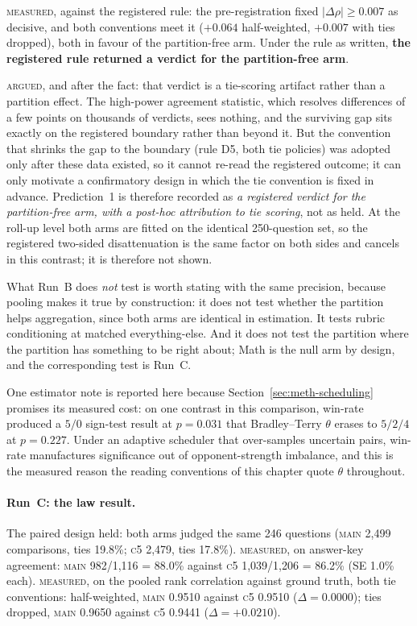 \textsc{measured}, against the registered rule: the pre-registration
fixed $|\Delta\rho| \ge 0.007$ as decisive, and both conventions meet
it ($+0.064$ half-weighted, $+0.007$ with ties dropped), both in
favour of the partition-free arm. Under the rule as written,
\textbf{the registered rule returned a verdict for the partition-free
arm}.

\textsc{argued}, and after the fact: that verdict is a tie-scoring
artifact rather than a partition effect. The high-power agreement
statistic, which resolves differences of a few points on thousands of
verdicts, sees nothing, and the surviving gap sits exactly on the
registered boundary rather than beyond it. But the convention that
shrinks the gap to the boundary (rule D5, both tie policies) was
adopted only after these data existed, so it cannot re-read the
registered outcome; it can only motivate a confirmatory design in
which the tie convention is fixed in advance. Prediction~1 is
therefore recorded as \emph{a registered verdict for the
partition-free arm, with a post-hoc attribution to tie scoring}, not
as held. At the roll-up level both arms are fitted on the identical
250-question set, so the registered two-sided disattenuation is the
same factor on both sides and cancels in this contrast; it is therefore
not shown.

What Run~B does \emph{not} test is worth stating with the same
precision, because pooling makes it true by construction: it does not
test whether the partition helps aggregation, since both arms are
identical in estimation. It tests rubric conditioning at matched
everything-else. And it does not test the partition where the partition
has something to be right about; Math is the null arm by design, and
the corresponding test is Run~C.

One estimator note is reported here because
Section~\ref{sec:meth-scheduling} promises its measured cost: on one
contrast in this comparison, win-rate produced a $5/0$ sign-test
result at $p = 0.031$ that Bradley--Terry $\theta$ erases to $5/2/4$
at $p = 0.227$. Under an adaptive scheduler that over-samples
uncertain pairs, win-rate manufactures significance out of
opponent-strength imbalance, and this is the measured reason the
reading conventions of this chapter quote $\theta$ throughout.


\paragraph{Run~C: the law result.} The paired design held: both arms
judged the same 246 questions (\textsc{main} 2{,}499 comparisons, ties
19.8\%; \textsc{c5} 2{,}479, ties 17.8\%). \textsc{measured}, on
answer-key agreement: \textsc{main} 982/1{,}116 = 88.0\% against
\textsc{c5} 1{,}039/1{,}206 = 86.2\% (SE 1.0\% each). \textsc{measured},
on the pooled rank correlation against ground truth, both tie
conventions: half-weighted, \textsc{main} 0.9510 against \textsc{c5}
0.9510 ($\Delta = 0.0000$); ties dropped, \textsc{main} 0.9650 against
\textsc{c5} 0.9441 ($\Delta = +0.0210$).

